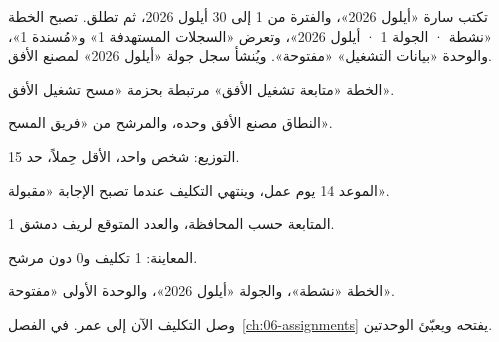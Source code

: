 \begin{rcnote}
تكتب سارة «أيلول 2026»، والفترة من 1 إلى 30 أيلول 2026، ثم تطلق. تصبح الخطة «نشطة · الجولة 1 · أيلول 2026»، وتعرض «السجلات المستهدفة 1» و«مُسندة 1»، والوحدة «بيانات التشغيل» «مفتوحة». ويُنشأ سجل جولة «أيلول 2026» لمصنع الأفق.
\end{rcnote}

\begin{rcchecklist}
\begin{checklist}
\item الخطة «متابعة تشغيل الأفق» مرتبطة بحزمة «مسح تشغيل الأفق».
\item النطاق مصنع الأفق وحده، والمرشح من «فريق المسح».
\item التوزيع: شخص واحد، الأقل حِملاً، حد 15.
\item الموعد 14 يوم عمل، وينتهي التكليف عندما تصبح الإجابة «مقبولة».
\item المتابعة حسب المحافظة، والعدد المتوقع لريف دمشق 1.
\item المعاينة: 1 تكليف و0 دون مرشح.
\item الخطة «نشطة»، والجولة «أيلول 2026»، والوحدة الأولى «مفتوحة».
\end{checklist}
\end{rcchecklist}

وصل التكليف الآن إلى عمر. في الفصل~\ref{ch:06-assignments} يفتحه ويعبّئ الوحدتين.
